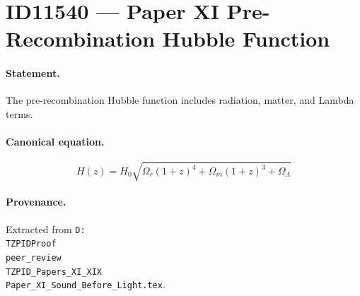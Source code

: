 \section*{ID11540 --- Paper XI Pre-Recombination Hubble Function}

\paragraph{Statement.}
The pre-recombination Hubble function includes radiation, matter, and Lambda terms.

\paragraph{Canonical equation.}
\[
H(z)=H_0\sqrt{\Omega_r(1+z)^4+\Omega_m(1+z)^3+\Omega_\Lambda}
\]

\paragraph{Provenance.}
Extracted from \texttt{D:\\TZPIDProof\\peer\_review\\TZPID\_Papers\_XI\_XIX\\Paper\_XI\_Sound\_Before\_Light.tex}.

